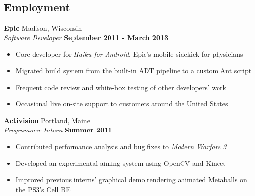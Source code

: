 \documentclass[line,margin]{res}
\begin{document}
 

\address{\url{www.luchenlabs.com}}
\address{bml4633@rit.edu}

                                  
\begin{resume}

\section{\sc Employment}
    \textbf{Epic} \hfill Madison, Wisconsin  \\
    \textsl{Software Developer} \hfill \textbf{September 2011 - March 2013}
    \vspace{0.05in}
    \begin{itemize}
        \item Core developer for \textsl{Haiku for Android}, Epic's mobile sidekick for physicians
        \item Migrated build system from the built-in ADT pipeline to a custom Ant script
        \item Frequent code review and white-box testing of other developers' work
        \item Occasional live on-site support to customers around the United States
    \end{itemize}

    \textbf{Activision} \hfill Portland, Maine  \\
    \textsl{Programmer Intern} \hfill \textbf{Summer 2011}
    \vspace{0.05in}
    \begin{itemize}
        \item Contributed performance analysis and bug fixes to \textsl{Modern Warfare 3}
        \item Developed an experimental aiming system using OpenCV and Kinect
        \item Improved previous interns' graphical demo rendering animated Metaballs on the PS3's Cell BE 
    \end{itemize}


\end{resume}
\end{document}
